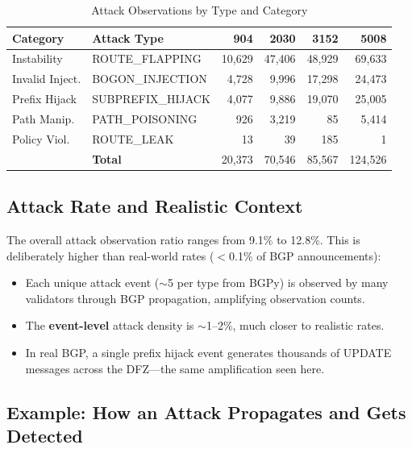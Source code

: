 \documentclass[11pt,a4paper]{article}
\begin{document}
\begin{table}[H]
\centering
\caption{Attack Observations by Type and Category}
\begin{tabular}{llrrrr}
\toprule
\textbf{Category} & \textbf{Attack Type} & \textbf{904} & \textbf{2030} & \textbf{3152} & \textbf{5008} \\
\midrule
Instability     & ROUTE\_FLAPPING      & 10,629 & 47,406 & 48,929 & 69,633 \\
Invalid Inject. & BOGON\_INJECTION     & 4,728  & 9,996  & 17,298 & 24,473 \\
Prefix Hijack   & SUBPREFIX\_HIJACK    & 4,077  & 9,886  & 19,070 & 25,005 \\
Path Manip.     & PATH\_POISONING      & 926    & 3,219  & 85     & 5,414 \\
Policy Viol.    & ROUTE\_LEAK          & 13     & 39     & 185    & 1 \\
\midrule
                & \textbf{Total}       & 20,373 & 70,546 & 85,567 & 124,526 \\
\bottomrule
\end{tabular}
\end{table}

\subsection{Attack Rate and Realistic Context}

The overall attack observation ratio ranges from 9.1\% to 12.8\%. This is
deliberately higher than real-world rates ($<$0.1\% of BGP announcements):

\begin{itemize}
    \item Each unique attack event ($\sim$5 per type from BGPy) is observed by many
          validators through BGP propagation, amplifying observation counts.
    \item The \textbf{event-level} attack density is $\sim$1--2\%, much closer to
          realistic rates.
    \item In real BGP, a single prefix hijack event generates thousands of
          UPDATE messages across the DFZ---the same amplification seen here.
\end{itemize}

\subsection{Example: How an Attack Propagates and Gets Detected}
\end{document}
